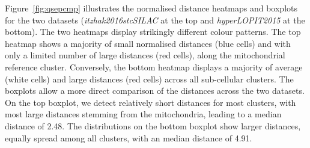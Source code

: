 \documentclass[12pt]{article}\usepackage[]{graphicx}\usepackage[]{color}
\begin{document}
Figure~\ref{fig:qsepcmp} illustrates the normalised distance heatmaps
and boxplots for the two datasets (\textit{itzhak2016stcSILAC} at the
top and \textit{hyperLOPIT2015} at the bottom). The two heatmaps
display strikingly different colour patterns. The top heatmap shows a
majority of small normalised distances (blue cells) and with only a
limited number of large distances (red cells), along the mitochondrial
reference cluster. Conversely, the bottom heatmap displays a majority
of average (white cells) and large distances (red cells) across all
sub-cellular clusters. The boxplots allow a more direct comparison of
the distances across the two datasets. On the top boxplot, we detect
relatively short distances for most clusters, with most large
distances stemming from the mitochondria, leading to a median distance
of 2.48. The distributions on the bottom boxplot
show larger distances, equally spread among all clusters, with an
median distance of 4.91.
\end{document}
